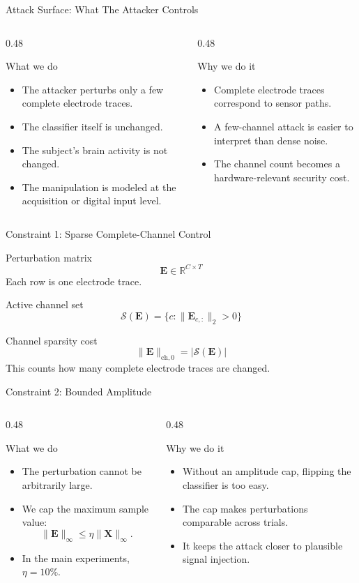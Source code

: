 \documentclass[aspectratio=169,11pt]{beamer}
\newcommand{\whatwhy}[2]{%
\begin{columns}[T,onlytextwidth]
  \begin{column}{0.48\textwidth}
    \begin{block}{What we do}
      #1
    \end{block}
  \end{column}
  \begin{column}{0.48\textwidth}
    \begin{block}{Why we do it}
      #2
    \end{block}
  \end{column}
\end{columns}
}
\begin{document}
\begin{frame}{Attack Surface: What The Attacker Controls}
\whatwhy{
\begin{itemize}
  \item The attacker perturbs only a few complete electrode traces.
  \item The classifier itself is unchanged.
  \item The subject's brain activity is not changed.
  \item The manipulation is modeled at the acquisition or digital input level.
\end{itemize}
}{
\begin{itemize}
  \item Complete electrode traces correspond to sensor paths.
  \item A few-channel attack is easier to interpret than dense noise.
  \item The channel count becomes a hardware-relevant security cost.
\end{itemize}
}
\end{frame}

\begin{frame}{Constraint 1: Sparse Complete-Channel Control}
\begin{block}{Perturbation matrix}
\[
\mathbf{E}\in\mathbb{R}^{C\times T}
\]
Each row is one electrode trace.
\end{block}

\begin{block}{Active channel set}
\[
\mathcal{S}(\mathbf{E})=\{c:\|\mathbf{E}_{c,:}\|_2>0\}
\]
\end{block}

\begin{block}{Channel sparsity cost}
\[
\|\mathbf{E}\|_{\mathrm{ch},0}=|\mathcal{S}(\mathbf{E})|
\]
This counts how many complete electrode traces are changed.
\end{block}
\end{frame}

\begin{frame}{Constraint 2: Bounded Amplitude}
\whatwhy{
\begin{itemize}
  \item The perturbation cannot be arbitrarily large.
  \item We cap the maximum sample value:
  \[
  \|\mathbf{E}\|_\infty \leq \eta\|\mathbf{X}\|_\infty .
  \]
  \item In the main experiments, \(\eta=10\%\).
\end{itemize}
}{
\begin{itemize}
  \item Without an amplitude cap, flipping the classifier is too easy.
  \item The cap makes perturbations comparable across trials.
  \item It keeps the attack closer to plausible signal injection.
\end{itemize}
}
\end{frame}
\end{document}
